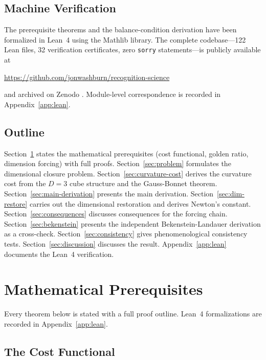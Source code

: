 \documentclass[12pt]{article}
\theoremstyle{definition}
\theoremstyle{remark}
\begin{document}
\subsection{Machine Verification}

The prerequisite theorems and the balance-condition derivation
have been formalized in Lean~4 using the Mathlib library. The
complete codebase---122 Lean files, 32 verification certificates,
zero \texttt{sorry} statements---is publicly available at
\begin{center}
  \url{https://github.com/jonwashburn/recognition-science}
\end{center}
and archived on Zenodo \cite{WashburnLean4Repo2026}.
Module-level correspondence is recorded in Appendix~\ref{app:lean}.

\subsection{Outline}

Section~\ref{sec:prereqs} states the mathematical prerequisites
(cost functional, golden ratio, dimension forcing) with full proofs.
Section~\ref{sec:problem} formulates the dimensional closure problem.
Section~\ref{sec:curvature-cost} derives the curvature cost from the
$D=3$ cube structure and the Gauss-Bonnet theorem.
Section~\ref{sec:main-derivation} presents the main derivation.
Section~\ref{sec:dim-restore} carries out the dimensional restoration
and derives Newton's constant.
Section~\ref{sec:consequences} discusses consequences for the forcing
chain. Section~\ref{sec:bekenstein} presents the independent
Bekenstein-Landauer derivation as a cross-check.
Section~\ref{sec:consistency} gives phenomenological consistency tests.
Section~\ref{sec:discussion} discusses the result.
Appendix~\ref{app:lean} documents the Lean~4 verification.

\section{Mathematical Prerequisites}
\label{sec:prereqs}

Every theorem below is stated with a full proof outline.
Lean~4 formalizations are recorded in Appendix~\ref{app:lean}.

\subsection{The Cost Functional}
\label{sec:Jcost}
\end{document}
